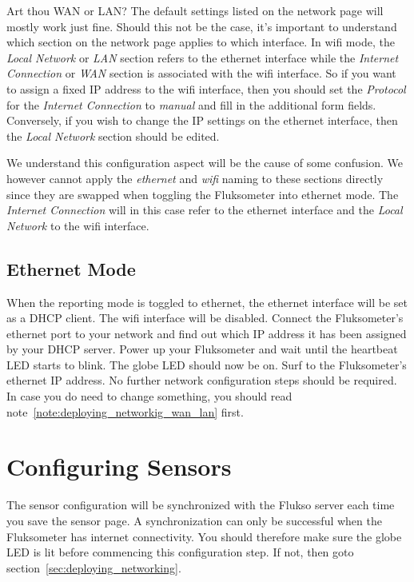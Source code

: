 \begin{aside}{Art thou WAN or LAN?}
\label{note:deploying_networkig_wan_lan}
The default settings listed on the network page will mostly work just fine. Should this not be the case, it's important to understand which section on the network page applies to which interface. In wifi mode, the \emph{Local Network} or \emph{LAN} section refers to the ethernet interface while the \emph{Internet Connection} or \emph{WAN} section is associated with the wifi interface. So if you want to assign a fixed IP address to the wifi interface, then you should set the \emph{Protocol} for the \emph{Internet Connection} to \emph{manual} and fill in the additional form fields. Conversely, if you wish to change the IP settings on the ethernet interface, then the \emph{Local Network} section should be edited.

We understand this configuration aspect will be the cause of some confusion. We however cannot apply the \emph{ethernet} and \emph{wifi} naming to these sections directly since they are swapped when toggling the Fluksometer into ethernet mode. The \emph{Internet Connection} will in this case refer to the ethernet interface and the \emph{Local Network} to the wifi interface.
\end{aside}

\subsection{Ethernet Mode}
\label{sec:deploying_networking_eth}
When the reporting mode is toggled to ethernet, the ethernet interface will be set as a DHCP client. The wifi interface will be disabled. Connect the Fluksometer's ethernet port to your network and find out which IP address it has been assigned by your DHCP server. Power up your Fluksometer and wait until the heartbeat LED starts to blink. The globe LED should now be on. Surf to the Fluksometer's ethernet IP address. No further network configuration steps should be required. In case you do need to change something, you should read note~\ref{note:deploying_networkig_wan_lan} first. 

\section{Configuring Sensors}

The sensor configuration will be synchronized with the Flukso server each time you save the sensor page. A synchronization can only be successful when the Fluksometer has internet connectivity.  You should therefore make sure the globe LED is lit before commencing this configuration step. If not, then goto section~\ref{sec:deploying_networking}.

